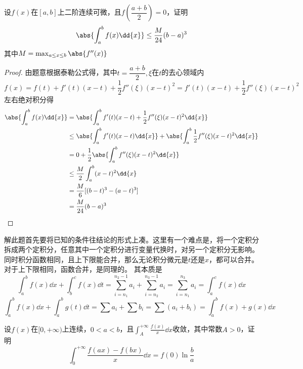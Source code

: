 \begin{example}
    设$f(x)$在$[a,b]$上二阶连续可微，且$f(\dfrac{a+b}{2})=0$，证明
    \[ \abs{\int_a^bf(x)\dd{x}} \leq \frac{M}{24}(b-a)^3  \]
    其中$M=\max_{a\leq x \leq b}\abs{f''(x)}$
\end{example}
\begin{proof}
    由题意根据泰勒公式得，其中$t=\dfrac{a+b}{2},\xi $在$t$的去心领域内
    \[
        f(x)  = f(t) + f'(t)(x-t)+ \frac{1}{2}f''(\xi)(x-t)^2
        = f'(t)(x-t) + \frac{1}{2}f''(\xi)(x-t)^2
    \]
    左右绝对积分得
    \begin{align*}
        \abs{\int_a^bf(x)\dd{x}}
         & = \abs{\int_a^bf'(t)(x-t) + \frac{1}{2}f''(\xi)(x-t)^2\dd{x}}                          \\
         & \leq \abs{\int_a^b f'(t)(x-t)\dd{x}} + \abs{\int_a^b \frac{1}{2}f''(\xi)(x-t)^2\dd{x}} \\
         & = 0 + \frac{1}{2}\abs{\int_a^b f''(\xi)(x-t)^2\dd{x}}                                  \\
         & \leq \frac{M}{2}\int_a^b (x-t)^2\dd{x}                                                 \\
         & =\frac{M}{6}[(b-t)^3 - (a-t)^3]                                                        \\
         & =\frac{M}{24}(b-a)^3
    \end{align*}
\end{proof}
解此题首先要将已知的条件往结论的形式上凑。这里有一个难点是，将一个定积分拆成两个定积分，任意其中一个定积分进行变量代换时，对另一个定积分无影响。
同时积分函数相同，且上下限能合并，那么无论积分微元是$t$还是$x$，都可以合并。对于上下限相同，函数合并，是同理的。
其本质是
\[
    \int_a^b f(x)\dd{x} + \int_b^c f(x)\dd{t}
    =
    \sum_{i=n_1}^{n_2-1} a_i + \sum_{i=n_2}^{n_3-1} a_i
    =
    \sum_{i=n_1}^{n_3} a_i = \int_a^c f(x)\dd{x}
\]
\[
    \int_a^b f(x)\dd{x} + \int_a^b g(t)\dd{t}
    =
    \sum a_i + \sum b_i = \sum (a_i + b_i)
    =
    \int_a^b f(x)+g(x)\dd{x}
\]
\begin{example}
    设$f(x)$在$[0,+\infty)$上连续，$0<a<b$，且$\displaystyle\int_A^{+\infty}\frac{f(x)}{x}\dd{x}$收敛，其中常数$A>0$，证明
    \[
        \int_0^{+\infty}\frac{f(ax)-f(bx)}{x}\dd{x} = f(0)\ln\frac{b}{a}
    \]
\end{example}
